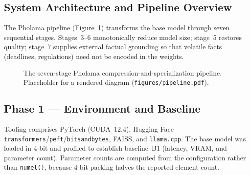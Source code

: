 \documentclass[11pt,a4paper]{article}
\begin{document}
\subsection{System Architecture and Pipeline Overview}
The Pholama pipeline (Figure~\ref{fig:pipeline}) transforms the base model
through seven sequential stages. Stages~3--6 monotonically reduce model size;
stage~5 restores quality; stage~7 supplies external factual grounding so that
volatile facts (deadlines, regulations) need not be encoded in the weights.

\begin{figure}[H]
  \centering
  \caption{The seven-stage Pholama compression-and-specialization pipeline.
  Placeholder for a rendered diagram (\texttt{figures/pipeline.pdf}).}
  \label{fig:pipeline}
\end{figure}

\subsection{Phase 1 --- Environment and Baseline}
Tooling comprises PyTorch (CUDA~12.4), Hugging Face
\texttt{transformers}/\texttt{peft}/\texttt{bitsandbytes}, FAISS, and
\texttt{llama.cpp}. The base model was loaded in 4-bit and profiled to
establish baseline~B1 (latency, VRAM, and parameter count). Parameter counts
are computed from the configuration rather than \texttt{numel()}, because
4-bit packing halves the reported element count.
\end{document}
